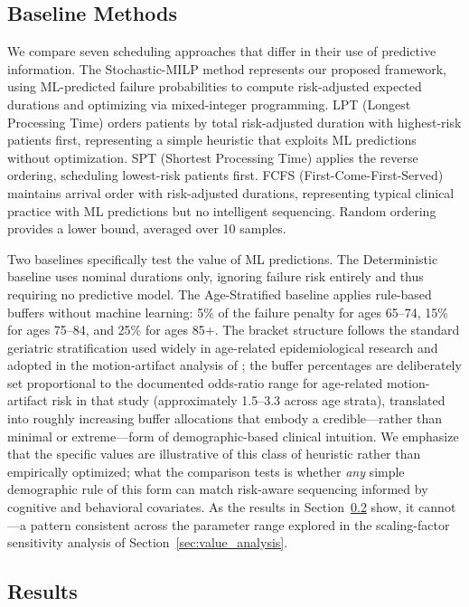 \documentclass[11pt,a4paper]{article}
\begin{document}
\subsection{Baseline Methods}
\label{sec:baselines}

We compare seven scheduling approaches that differ in their use of predictive information. The Stochastic-MILP method represents our proposed framework, using ML-predicted failure probabilities to compute risk-adjusted expected durations and optimizing via mixed-integer programming. LPT (Longest Processing Time) orders patients by total risk-adjusted duration with highest-risk patients first, representing a simple heuristic that exploits ML predictions without optimization. SPT (Shortest Processing Time) applies the reverse ordering, scheduling lowest-risk patients first. FCFS (First-Come-First-Served) maintains arrival order with risk-adjusted durations, representing typical clinical practice with ML predictions but no intelligent sequencing. Random ordering provides a lower bound, averaged over 10 samples.

Two baselines specifically test the value of ML predictions. The Deterministic baseline uses nominal durations only, ignoring failure risk entirely and thus requiring no predictive model. The Age-Stratified baseline applies rule-based buffers without machine learning: 5\% of the failure penalty for ages 65--74, 15\% for ages 75--84, and 25\% for ages 85+. The bracket structure follows the standard geriatric stratification used widely in age-related epidemiological research and adopted in the motion-artifact analysis of \citet{porembka2025disparities}; the buffer percentages are deliberately set proportional to the documented odds-ratio range for age-related motion-artifact risk in that study (approximately 1.5--3.3 across age strata), translated into roughly increasing buffer allocations that embody a credible---rather than minimal or extreme---form of demographic-based clinical intuition. We emphasize that the specific values are illustrative of this class of heuristic rather than empirically optimized; what the comparison tests is whether \emph{any} simple demographic rule of this form can match risk-aware sequencing informed by cognitive and behavioral covariates. As the results in Section~\ref{sec:results} show, it cannot---a pattern consistent across the parameter range explored in the scaling-factor sensitivity analysis of Section~\ref{sec:value_analysis}.


\subsection{Results}
\label{sec:results}
\end{document}
